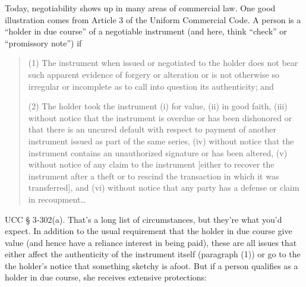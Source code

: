 Today, negotiability shows up in many areas of commercial law. One good
illustration comes from Article 3 of the Uniform Commercial Code. A person is a
``holder in due course'' of a negotiable instrument (and here, think ``check''
or ``promissory note'') if 
\begin{quotation}
(1) The instrument when issued or negotiated to the holder does not bear such
apparent evidence of forgery or alteration or is not otherwise so irregular or
incomplete as to call into question its authenticity; and 

(2) The holder took the instrument (i) for value, (ii) in good faith, (iii)
without notice that the instrument is overdue or has been dishonored or that
there is an uncured default with respect to payment of another instrument
issued as part of the same series, (iv) without notice that the instrument
contains an unauthorized signature or has been altered, (v) without notice of
any claim to the instrument [either to recover the instrument after a theft or
to rescind the transaction in which it was transferred], and (vi) without
notice that any party has a defense or claim in recoupment\ldots
\end{quotation}
UCC {\S} 3-302(a). That's a long list of circumstances, but they're what you'd
expect. In addition to the usual requirement that the holder in due course give
value (and hence have a reliance interest in being paid), these are all issues
that either affect the authenticity of the instrument itself (paragraph (1)) or
go to the the holder's notice that something sketchy is afoot. But if a person
qualifies as a holder in due course, she receives extensive protections:
